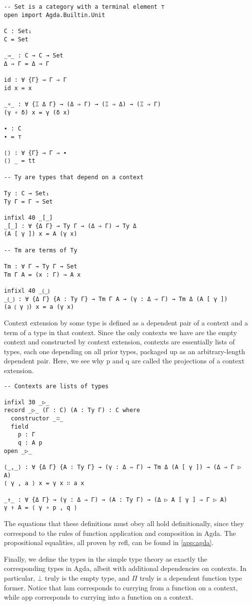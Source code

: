 \documentclass{article}
\renewcommand{\_}{\textrm{\textscale{.5}{\textunderscore}}}
\newcommand{\p}{\mathrm{p}}
\newcommand{\q}{\mathrm{q}}
\theoremstyle{definition}
\theoremstyle{plain}
\begin{document}
\begin{verbatim}
-- Set is a category with a terminal element ⊤
open import Agda.Builtin.Unit

C : Set₁
C = Set

_⇒_ : C → C → Set
Δ ⇒ Γ = Δ → Γ

id : ∀ {Γ} → Γ ⇒ Γ
id x = x

_∘_ : ∀ {Ξ Δ Γ} → (Δ ⇒ Γ) → (Ξ ⇒ Δ) → (Ξ ⇒ Γ)
(γ ∘ δ) x = γ (δ x)

∙ : C
∙ = ⊤

⟨⟩ : ∀ {Γ} → Γ ⇒ ∙
⟨⟩ _ = tt

-- Ty are types that depend on a context

Ty : C → Set₁
Ty Γ = Γ → Set

infixl 40 _[_]
_[_] : ∀ {Δ Γ} → Ty Γ → (Δ ⇒ Γ) → Ty Δ
(A [ γ ]) x = A (γ x)

-- Tm are terms of Ty

Tm : ∀ Γ → Ty Γ → Set
Tm Γ A = (x : Γ) → A x

infixl 40 _⟮_⟯
_⟮_⟯ : ∀ {Δ Γ} {A : Ty Γ} → Tm Γ A → (γ : Δ ⇒ Γ) → Tm Δ (A [ γ ])
(a ⟮ γ ⟯) x = a (γ x)
\end{verbatim}

Context extension by some type is defined as a dependent pair of a context and a term of a type in that context.
Since the only contexts we have are the empty context and constructed by context extension,
contexts are essentially lists of types, each one depending on all prior types,
packaged up as an arbitrary-length dependent pair.
Here, we see why $\p$ and $\q$ are called the projections of a context extension.

\begin{verbatim}
-- Contexts are lists of types

infixl 30 _▷_
record _▷_ (Γ : C) (A : Ty Γ) : C where
  constructor _∷_
  field
    p : Γ
    q : A p
open _▷_

⟨_,_⟩ : ∀ {Δ Γ} {A : Ty Γ} → (γ : Δ ⇒ Γ) → Tm Δ (A [ γ ]) → (Δ ⇒ Γ ▷ A)
⟨ γ , a ⟩ x = γ x ∷ a x

_↑_ : ∀ {Δ Γ} → (γ : Δ ⇒ Γ) → (A : Ty Γ) → (Δ ▷ A [ γ ] ⇒ Γ ▷ A)
γ ↑ A = ⟨ γ ∘ p , q ⟩
\end{verbatim}

The equations that these definitions must obey all hold definitionally,
since they correspond to the rules of function application and composition in Agda.
The propositional equalities, all proven by {\codefont refl}, can be found in \cref{app:agda}.

Finally, we define the types in the simple type theory as exactly the corresponding types in Agda,
albeit with additional dependencies on contexts.
In particular, $\bot$ truly is the empty type, and $\Pi$ truly is a dependent function type former.
Notice that {\codefont lam} corresponds to currying from a function on a context,
while {\codefont app} corresponds to currying into a function on a context.
\end{document}

